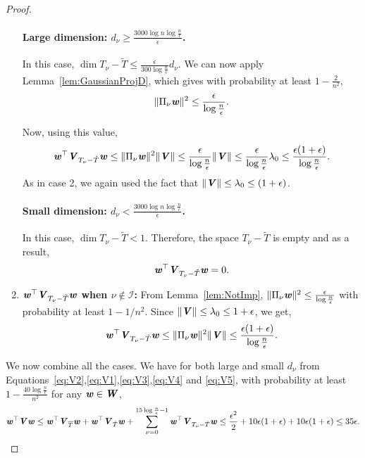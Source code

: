 \begin{proof}
\begin{enumerate}
    \paragraph{Large dimension: $d_{\nu}\geq \frac{3000\log n\log\frac{n}{\epsilon}}{\epsilon}$.}
    In this case, $\dim{T_{\nu} -\tilde{T}} \leq \frac{\epsilon}{300\log\frac{n}{\epsilon}} d_{\nu}$. We can now apply Lemma~\ref{lem:GaussianProjD}, which gives with probability at least $1-\frac{2}{n^2}$,
    \[
\|\Pi_{\nu}\boldsymbol{\mathit{w}}\|^2 \leq \frac{\epsilon}{\log\frac{n}{\epsilon}}.
    \]

    Now, using this value,
    \begin{equation}\label{eq:V3}
    \boldsymbol{\mathit{w}}^{\top}\boldsymbol{\mathit{V}}_{T_{\nu} -\tilde{T}}\boldsymbol{\mathit{w}} \leq \|\Pi_{\nu}\boldsymbol{\mathit{w}}\|^2 \|\boldsymbol{\mathit{V}}\| \leq \frac{\epsilon}{\log\frac{n}{\epsilon}} \|\boldsymbol{\mathit{V}}\|\leq  \frac{\epsilon}{\log\frac{n}{\epsilon}} \lambda_0 \leq  \frac{\epsilon(1+\epsilon)}{\log\frac{n}{\epsilon}}.
    \end{equation}
    As in case 2, we again used the fact that $\|\boldsymbol{\mathit{V}}\| \le \lambda_0 \le (1+\epsilon)$.
    \paragraph{Small dimension: $d_{\nu}<\frac{3000\log n\log\frac{n}{\epsilon}}{\epsilon}$.}
    In this case, $\dim{T_{\nu} -\tilde{T}}<1.$ Therefore, the space $T_{\nu} -\tilde{T}$ is empty and as a result, 
    \begin{equation}\label{eq:V4}
    \boldsymbol{\mathit{w}}^{\top}\boldsymbol{\mathit{V}}_{T_{\nu} -\tilde{T}}\boldsymbol{\mathit{w}}  = 0.
    \end{equation}
\item \textbf{$\boldsymbol{\mathit{w}}^\top\boldsymbol{\mathit{V}}_{T_{\nu} -\tilde{T}}\boldsymbol{\mathit{w}}$ when $\nu \notin \mathcal{I}$:}
From Lemma~\ref{lem:NotImp}, $\|\Pi_{\nu}\boldsymbol{\mathit{w}}\|^2 \leq \frac{\epsilon}{\log\frac{n}{\epsilon}}$ with probability at least $1-1/n^2$. Since $\|\boldsymbol{\mathit{V}}\|\leq \lambda_0\leq 1+\epsilon$, we get,
\begin{equation}\label{eq:V5}
\boldsymbol{\mathit{w}}^{\top}\boldsymbol{\mathit{V}}_{T_{\nu} -\tilde{T}}\boldsymbol{\mathit{w}} \leq \|\Pi_{\nu}\boldsymbol{\mathit{w}}\|^2 \|\boldsymbol{\mathit{V}}\| \le \frac{\epsilon(1+\epsilon)}{\log\frac{n}{\epsilon}}.
\end{equation}
\end{enumerate}
We now combine all the cases. We have for both large and small $d_{\nu}$ from Equations~\eqref{eq:V2},\eqref{eq:V1},\eqref{eq:V3},\eqref{eq:V4} and \eqref{eq:V5}, with probability at least $1-\frac{40\log\frac{n}{\epsilon}}{n^2}$ for any $\boldsymbol{\mathit{w}}\in \boldsymbol{\mathit{W}}$,
\[
\boldsymbol{\mathit{w}}^{\top}\boldsymbol{\mathit{V}}\boldsymbol{\mathit{w}} \leq \boldsymbol{\mathit{w}}^{\top}\boldsymbol{\mathit{V}}_{\overline{T}}\boldsymbol{\mathit{w}} + \boldsymbol{\mathit{w}}^{\top}\boldsymbol{\mathit{V}}_{\tilde{T}}\boldsymbol{\mathit{w}} + \sum_{\nu = 0}^{15\log\frac{n}{\epsilon}-1}\boldsymbol{\mathit{w}}^{\top}\boldsymbol{\mathit{V}}_{T_{\nu} -\tilde{T}}\boldsymbol{\mathit{w}} \leq \frac{\epsilon^2}{2} + 10\epsilon(1+\epsilon) + 10\epsilon(1+\epsilon) \leq 35\epsilon.
\]

\end{proof}

